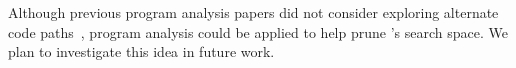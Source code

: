 Although previous program analysis papers did not consider
exploring alternate code
paths~\cite{Lee:2011:TGR:1993498.1993528,tallam2007enabling,huang2012lean,cai2013lock,elyasov2013guided,wang2015fast},
program analysis could be applied to help prune \sys's search space. We plan
to investigate this idea in future work.

%
%
%

